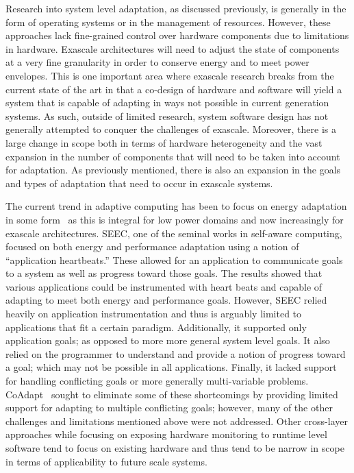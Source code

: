     Research into system level adaptation, as discussed previously, is generally in the form of operating systems or in the management of resources. However, these approaches lack fine-grained control over hardware components due to limitations in hardware. Exascale architectures will need to adjust the state of components at a very fine granularity in order to conserve energy and to meet power envelopes. This is one important area where exascale research breaks from the current state of the art in that a co-design of hardware and software will yield a system that is capable of adapting in ways not possible in current generation systems. As such, outside of limited research, system software design has not generally attempted to conquer the challenges of exascale. Moreover, there is a large change in scope both in terms of hardware heterogeneity and the vast expansion in the number of components that will need to be taken into account for adaptation. As previously mentioned, there is also an expansion in the goals and types of adaptation that need to occur in exascale systems.
    
    The current trend in adaptive computing has been to focus on energy adaptation in some form~\cite{BaekEtAl2010, SorberEtAl2007} as this is integral for low power domains and now increasingly for exascale architectures. SEEC, one of the seminal works in self-aware computing,~\cite{Hoffman2013} focused on both energy and performance adaptation using a notion of ``application heartbeats.'' These allowed for an application to communicate goals to a system as well as progress toward those goals. The results showed that various applications could be instrumented with heart beats and capable of adapting to meet both energy and performance goals. However, SEEC relied heavily on application instrumentation and thus is arguably limited to applications that fit a certain paradigm. Additionally, it supported only application goals; as opposed to more more general system level goals. It also relied on the programmer to understand and provide a notion of progress toward a goal; which may not be possible in all applications. Finally, it lacked support for handling conflicting goals or more generally multi-variable problems. CoAdapt~\cite{Hoffmann2014} sought to eliminate some of these shortcomings by providing limited support for adapting to multiple conflicting goals; however, many of the other challenges and limitations mentioned above were not addressed. Other cross-layer approaches while focusing on exposing hardware monitoring to runtime level software tend to focus on existing hardware and thus tend to be narrow in scope in terms of applicability to future scale systems.
